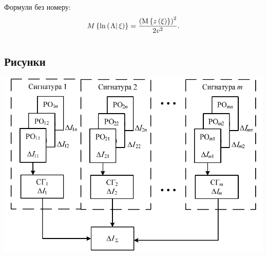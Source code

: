 \begin{multicols}{2} %

Формули без номеру: 
$$
M\left\{ {\ln \left( {\left. \Lambda  \right|\xi } \right)} \right\} = \frac{{{{\left( {{\rm M}\left\{ {z\left( \xi  \right)} \right\}} \right)}^2}}}{{2{v^2}}}.
$$	
 
   
  

\section{ }

\subsection{Рисунки}
 
\begin{Figure}\centering%
\includegraphics[width=\linewidth]{fig1}
\label{radap1627fig1}
\end{Figure}
 

\end{multicols}
